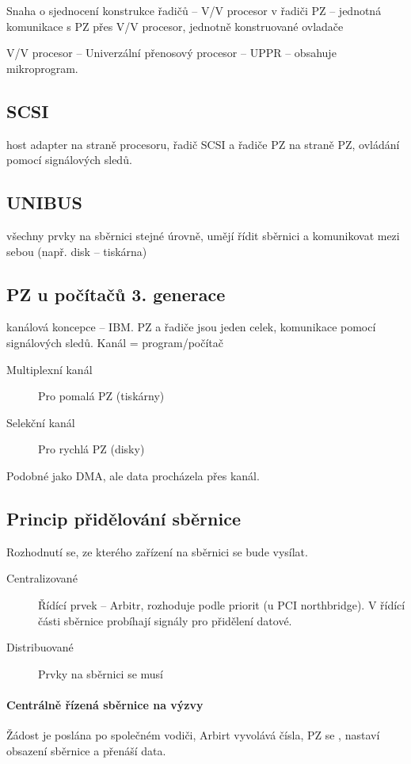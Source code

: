 \documentclass[a4wide]{report}
\begin{document}
Snaha o sjednocení konstrukce řadičů -- V/V procesor v řadiči PZ -- jednotná komunikace s PZ přes V/V procesor, jednotně konstruované ovladače

V/V procesor -- Univerzální přenosový procesor -- UPPR -- obsahuje mikroprogram.

\subsection{SCSI}
host adapter na straně procesoru, řadič SCSI a řadiče PZ na straně PZ, ovládání pomocí signálových sledů.

\subsection{UNIBUS}
všechny prvky na sběrnici stejné úrovně, umějí řídit sběrnici a komunikovat mezi sebou (např. disk -- tiskárna)

\subsection{PZ u počítačů 3. generace}
kanálová koncepce -- IBM. PZ a řadiče jsou jeden celek, komunikace pomocí signálových sledů. Kanál = program/počítač

\begin{description}
	\item[Multiplexní kanál] Pro pomalá PZ (tiskárny)
	\item[Selekční kanál] Pro rychlá PZ (disky)
\end{description}

Podobné jako DMA, ale data procházela přes kanál.

\subsection{Princip přidělování sběrnice}

Rozhodnutí se, ze kterého zařízení na sběrnici se bude vysílat.

\begin{description}
	\item[Centralizované] Řídící prvek -- Arbitr, rozhoduje podle priorit (u PCI northbridge). V řídící části sběrnice probíhají signály pro přidělení datové.
	\item[Distribuované] Prvky na sběrnici se musí 
\end{description}

\paragraph{Centrálně řízená sběrnice na výzvy}
Žádost je poslána po společném vodiči, Arbirt vyvolává čísla, PZ se , nastaví obsazení sběrnice a přenáší data.
\end{document}
